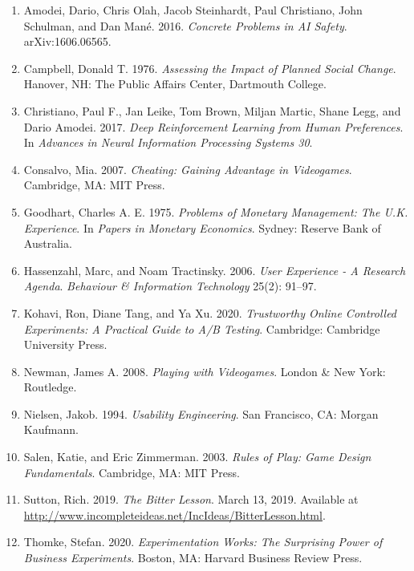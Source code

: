 \documentclass[11pt]{article}
\begin{document}
\begin{enumerate}
  \item Amodei, Dario, Chris Olah, Jacob Steinhardt, Paul Christiano, John Schulman, and Dan Man\'e. 2016. \textit{Concrete Problems in AI Safety}. arXiv:1606.06565.
  \item Campbell, Donald T. 1976. \textit{Assessing the Impact of Planned Social Change}. Hanover, NH: The Public Affairs Center, Dartmouth College.
  \item Christiano, Paul F., Jan Leike, Tom Brown, Miljan Martic, Shane Legg, and Dario Amodei. 2017. \textit{Deep Reinforcement Learning from Human Preferences}. In \textit{Advances in Neural Information Processing Systems 30}.
  \item Consalvo, Mia. 2007. \textit{Cheating: Gaining Advantage in Videogames}. Cambridge, MA: MIT Press.
  \item Goodhart, Charles A. E. 1975. \textit{Problems of Monetary Management: The U.K. Experience}. In \textit{Papers in Monetary Economics}. Sydney: Reserve Bank of Australia.
  \item Hassenzahl, Marc, and Noam Tractinsky. 2006. \textit{User Experience - A Research Agenda}. \textit{Behaviour \& Information Technology} 25(2): 91--97.
  \item Kohavi, Ron, Diane Tang, and Ya Xu. 2020. \textit{Trustworthy Online Controlled Experiments: A Practical Guide to A/B Testing}. Cambridge: Cambridge University Press.
  \item Newman, James A. 2008. \textit{Playing with Videogames}. London \& New York: Routledge.
  \item Nielsen, Jakob. 1994. \textit{Usability Engineering}. San Francisco, CA: Morgan Kaufmann.
  \item Salen, Katie, and Eric Zimmerman. 2003. \textit{Rules of Play: Game Design Fundamentals}. Cambridge, MA: MIT Press.
  \item Sutton, Rich. 2019. \textit{The Bitter Lesson}. March 13, 2019. Available at \url{http://www.incompleteideas.net/IncIdeas/BitterLesson.html}.
  \item Thomke, Stefan. 2020. \textit{Experimentation Works: The Surprising Power of Business Experiments}. Boston, MA: Harvard Business Review Press.
\end{enumerate}
\end{document}
